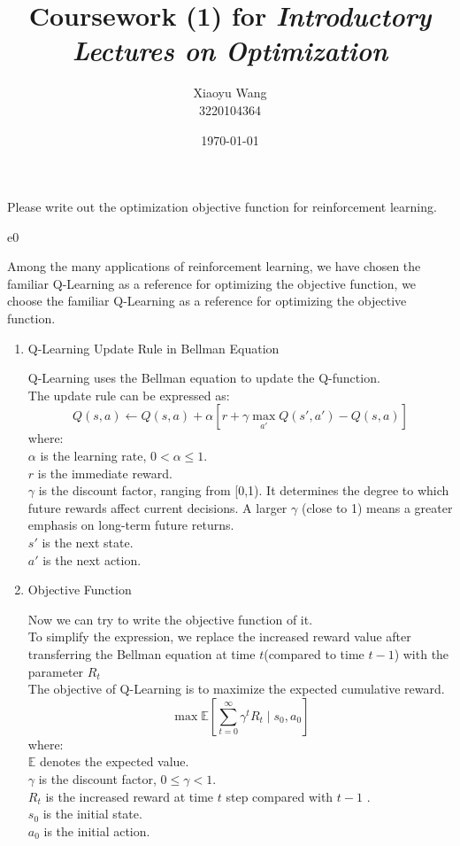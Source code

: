 \documentclass{article}
\title{Coursework (1) for \emph{Introductory Lectures on Optimization}}
\author{Xiaoyu Wang \\ 3220104364}
\date{\today}
\begin{document}
\maketitle

\begin{excercise}\label{e0}
Please write out the optimization objective function for reinforcement learning.
\end{excercise}
\begin{SOLUTION}{e0}

Among the many applications of reinforcement learning,
we have chosen the familiar Q-Learning as a reference for 
optimizing the objective function, we choose the familiar 
Q-Learning as a reference for optimizing the objective function.

\begin{enumerate}
	\item Q-Learning Update Rule in Bellman Equation

	Q-Learning uses the Bellman equation to update the Q-function. \\
	The update rule can be expressed as:
	\[
		Q(s, a) \leftarrow Q(s, a) + \alpha \left[ r + \gamma \max_{a'} Q(s', a') - Q(s, a) \right]
	\]
	where:\\
	\( \alpha \) is the learning rate, \( 0 < \alpha \leq 1 \).\\
	\( r \) is the immediate reward.\\
	\( \gamma \) is the discount factor, ranging from [0,1). It determines the degree to which future rewards affect current decisions. A larger \( \gamma \) (close to 1) means a greater emphasis on long-term future returns.\\
	\( s' \) is the next state.\\
	\( a' \) is the next action.
	\item Objective Function
	
	Now we can try to write the objective function of it.\\
	To simplify the expression, we replace the increased reward value after transferring the Bellman equation at time $t $(compared to time $t-1 $) with the parameter $R_t$\\
	The objective of Q-Learning is to maximize the expected cumulative reward. 
	\[
	\max \mathbb{E} \left[ \sum_{t=0}^{\infty} \gamma^t R_t \mid s_0, a_0\right]
	\]
	where:\\
	\( \mathbb{E} \) denotes the expected value.\\
	\( \gamma \) is the discount factor, \( 0 \leq \gamma < 1 \).\\
	\( R_t \) is the increased reward at time \( t \) step compared with \( t-1 \) .\\
	\( s_0 \) is the initial state.\\
	\( a_0 \) is the initial action.
\end{enumerate}
\end{SOLUTION}
\end{document}
